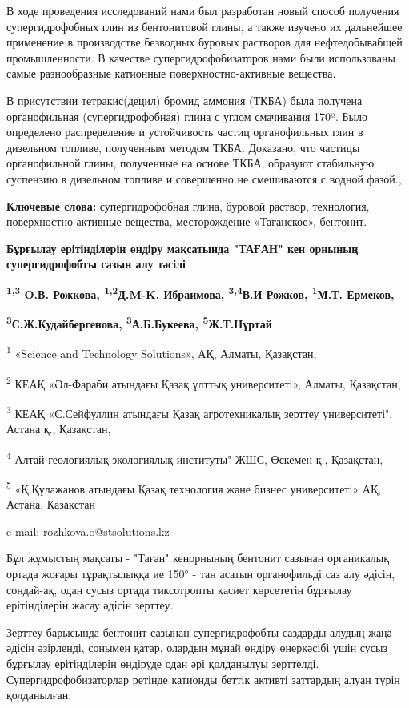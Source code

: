 В ходе проведения исследований нами был разработан новый способ
получения супергидрофобных глин из бентонитовой глины, а также изучено
их дальнейшее применение в производстве безводных буровых растворов для
нефтедобывабщей промышленности. В качестве супергидрофобизаторов нами
были использованы самые разнообразные катионные поверхностно-активные
вещества.

В присутствии тетракис(децил) бромид аммония (ТКБА) была получена
органофильная (супергидрофобная) глина с углом смачивания 170º. Было
определено распределение и устойчивость частиц органофильных глин в
дизельном топливе, полученным методом ТКБА. Доказано, что частицы
органофильной глины, полученные на основе ТКБА, образуют стабильную
суспензию в дизельном топливе и совершенно не смешиваются с водной
фазой.,

\textbf{Ключевые слова:} супергидрофобная глина, буровой раствор,
технология, поверхностно-активные вещества, месторождение «Таганское»,
бентонит.

\textbf{Бұрғылау ерітінділерін өндіру мақсатында "ТАҒАН" кен орнының
супергидрофобты сазын алу тәсілі}

\textbf{\textsuperscript{1,3} O.В. Рожкова, \textsuperscript{1,2}Д.M-K.
Ибраимова, \textsuperscript{3,4}В.И Рожков, \textsuperscript{1}М.Т.
Ермеков,}

\textbf{\textsuperscript{3}С.Ж.Кудайбергенова,
\textsuperscript{3}А.Б.Букеева, \textsuperscript{5}Ж.Т.Нұртай}

\textsuperscript{1} «Science and Technology Solutions», АҚ, Алматы,
Қазақстан,

\textsuperscript{2} КЕАҚ «Әл-Фараби атындағы Қазақ ұлттық университеті»,
Алматы, Қазақстан,

\textsuperscript{3} КЕАҚ «С.Сейфуллин атындағы Қазақ агротехникалық
зерттеу университеті", Астана қ., Қазақстан,

\textsuperscript{4} Алтай геологиялық-экологиялық институты" ЖШС,
Өскемен қ., Қазақстан,

\textsuperscript{5} «Қ.Құлажанов атындағы Қазақ технология және бизнес
университеті» АҚ, Астана, Қазақстан

e-mail: rozhkova.o@stsolutions.kz

Бұл жұмыстың мақсаты - "Таған" кенорнының бентонит сазынан органикалық
ортада жоғары тұрақтылыққа ие 150° - тан асатын органофильді саз алу
әдісін, сондай-ақ, одан сусыз ортада тиксотропты қасиет көрсететін
бұрғылау ерітінділерін жасау әдісін зерттеу.

Зерттеу барысында бентонит сазынан супергидрофобты саздарды алудың жаңа
әдісін әзірленді, сонымен қатар, олардың мұнай өндіру өнеркәсібі үшін
сусыз бұрғылау ерітінділерін өндіруде одан әрі қолданылуы зерттелді.
Супергидрофобизаторлар ретінде катионды беттік активті заттардың алуан
түрін қолданылған.

